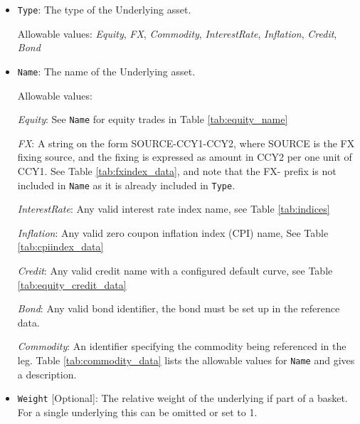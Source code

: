 \begin{itemize}

\item \lstinline!Type!: The type of the Underlying asset.

  Allowable values:  \emph{Equity}, \emph{FX}, \emph{Commodity}, \emph{InterestRate}, \emph{Inflation}, \emph{Credit}, \emph{Bond}

\item \lstinline!Name!:
  The name of the Underlying asset. 
  
  Allowable values:  

  \emph{Equity}: See \lstinline!Name! for equity trades in Table \ref{tab:equity_name}

  \emph{FX}: A string on the form SOURCE-CCY1-CCY2, where SOURCE is the FX fixing source, and the fixing is expressed as amount in CCY2 per one unit of CCY1.  See Table \ref{tab:fxindex_data}, and note that the FX- prefix is not included in \lstinline!Name! as it is already included in \lstinline!Type!.

 \emph{InterestRate}: Any valid interest rate index name, see Table \ref{tab:indices}

 \emph{Inflation}: Any valid zero coupon inflation index (CPI) name, See Table \ref{tab:cpiindex_data}

 \emph{Credit}: Any valid credit name with a configured default curve, see Table \ref{tab:equity_credit_data}

 \emph{Bond}: Any valid bond identifier, the bond must be set up in the reference data.

 \emph{Commodity}: An identifier specifying the commodity being referenced in the leg.
Table \ref{tab:commodity_data} lists the allowable values for \lstinline!Name! and gives a description. \\

\item \lstinline!Weight! [Optional]:
The relative weight of the underlying if part of a basket. For a single underlying this can be omitted or set to 1. 


\end{itemize}
